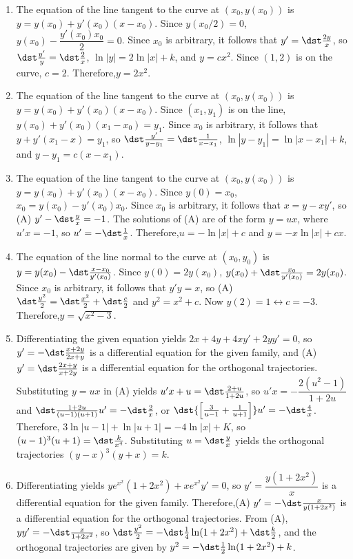 \documentclass[openany]{book}
\newenvironment{sectionSolutions}{
 \begin{enumerate}[item-label={\thesection.\arabic{enumi}.}]
}{
 \end{enumerate}
}
\begin{document}
\begin{sectionSolutions}
\item
The equation of the line tangent to the curve at $(x_0,y(x_0))$
is $y=y(x_0)+y'(x_0)(x-x_0)$. Since $y(x_0/2)=0$,
$y(x_0)-\dfrac{y'(x_0)x_0}{2}=0$. Since $x_0$ is arbitrary,
it follows that $y'=\dst\frac{2y}{ x}$, so
$\dst\frac{y'}{ y}=\dst\frac{2}{ x}$, $\ln|y|=2\ln|x|+k$, and
$y=cx^2$. Since $(1,2)$ is on the curve, $c=2$. Therefore,$y=2x^2$.


\item
The equation of the line tangent to the curve at $(x_0,y(x_0))$ is
$y=y(x_0)+y'(x_0)(x-x_0)$. Since $(x_1,y_1)$ is on the line,
$y(x_0)+y'(x_0)(x_1-x_0)=y_1$. Since $x_0$ is arbitrary, it follows
that $y+y'(x_1-x)=y_1$, so $\dst\frac{y'}{ y-y_1}=\dst\frac{1}{ x-x_1}$,
$\ln|y-y_1|=\ln|x-x_1|+k$, and $y-y_1=c(x-x_1)$.


\item
The equation of the line tangent to the curve at $(x_0,y(x_0))$ is
$y=y(x_0)+y'(x_0)(x-x_0)$. Since $y(0)=x_0$, $x_0=y(x_0)-y'(x_0)x_0$.
Since $x_0$ is arbitrary, it follows that $x=y-xy'$, so (A)
$y'-\dst\frac{y}{ x}=-1$. The solutions of (A) are of the form $y=ux$,
where $u'x=-1$, so $u'=-\dst\frac{1}{ x}$. Therefore,$u=-\ln|x|+c$ and
$y=-x\ln|x|+cx$.


\item
The equation of the line normal to the curve at $(x_0,y_0)$ is
$y=y(x_0)-\dst\frac{x-x_0}{ y'(x_0)}$. Since $y(0)=2y(x_0)$,
$y(x_0)+\dst\frac{x_0}{ y'(x_0)}=2y(x_0)$. Since $x_0$ is arbitrary, it
follows that $y'y=x$, so (A)
$\dst\frac{y^2}{2}=\dst\frac{x^2}{2}+\dst\frac{c}{2}$ and $y^2=x^2+c$. Now
$y(2)=1\leftrightarrow c=-3$. Therefore,$y=\sqrt{x^2-3}$.


\item
Differentiating the given equation yields $2x+4y+4xy'+2yy'=0$, so
$y'=-\dst\frac{x+2y}{2x+y}$ is a differential equation for the given
family, and (A) $y'=\dst\frac{2x+y}{ x+2y}$ is a differential equation
for the orthogonal trajectories. Substituting $y=ux$ in (A) yields
$u'x+u=\dst\frac{2+u}{1+2u}$, so $u'x=-\dfrac{2(u^2-1)}{1+2u}$ and
$\dst\frac{1+2u}{(u-1)(u+1)}u'=-\dst\frac{2}{ x}$, or $\dst{\left[\frac{3}{
u-1}+\frac{1}{ u+1}\right]}u'=-\dst\frac{4}{ x}$. Therefore,
$3\ln|u-1|+\ln|u+1|=-4\ln|x|+K$, so $(u-1)^3(u+1)=\dst\frac{k}{ x^4}$.
Substituting $u=\dst\frac{y}{ x}$ yields the orthogonal trajectories
$(y-x)^3(y+x)=k$.


\item
Differentiating yields $ye^{x^2}(1+2x^2)+xe^{x^2}y'=0$, so
$y'=\dfrac{y(1+2x^2)}{ x}$ is a differential equation for the given
family. Therefore,(A) $y'=-\dst\frac{x}{ y(1+2x^2)}$ is a differential
equation for the orthogonal trajectories. From (A),
$yy'=-\dst\frac{x}{1+2x^2}$, so
$\dst\frac{y^2}{2}=-\dst\frac{1}{4}\ln(1+2x^2)+\dst\frac{k}{2}$, and the
orthogonal trajectories are given by
$y^2=-\dst\frac{1}{2}\ln(1+2x^2)+k$.



\end{sectionSolutions}
\end{document}

